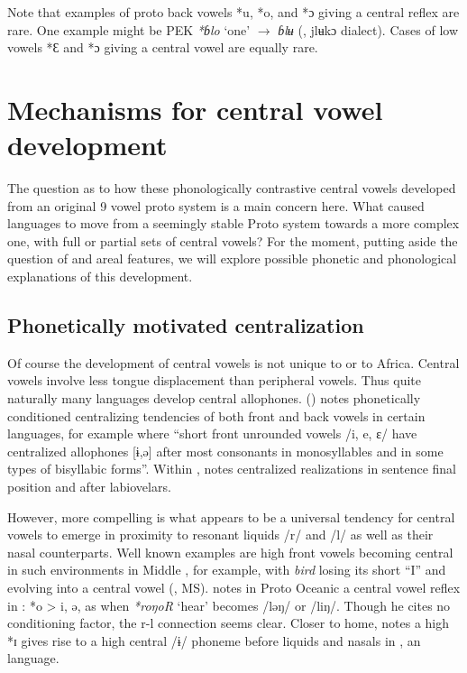 \documentclass[output=paper,newtxmath,modfonts,nonflat,draft]{langsci/langscibook}
\begin{document}
Note that examples of proto back vowels *u, *o, and *ɔ giving a central reflex are rare.  One example might be PEK \textit{*ɓlo} ‘one’ $\rightarrow$ \textit{ɓlʉ}  (, jlʉkɔ dialect). Cases of low vowels *Ɛ and *ɔ giving a central vowel are equally rare.

\section{Mechanisms for central vowel development}\label{sec:zogbo:4}

The question as to how these phonologically contrastive central vowels developed from an original 9 vowel proto system is a main concern here. What caused languages to move from a seemingly stable Proto system towards a more complex one, with full or partial sets of central vowels? For the moment, putting aside the question of  and areal features, we will explore possible phonetic and phonological explanations of this development. 

\subsection{Phonetically motivated centralization}\label{sec:zogbo:4.1}

Of course the development of central vowels is not unique to  or to Africa. Central vowels involve less tongue displacement than peripheral vowels. Thus quite naturally many languages develop central allophones. \citeauthor{Welmers1973} (\citeyear[23, 25]{Welmers1973}) notes phonetically conditioned centralizing tendencies of both front and back vowels in certain  languages, for example  where “short front unrounded vowels /i, e, ɛ/ have centralized allophones [ɨ,ə] after most consonants in monosyllables and in some types of bisyllabic forms”. Within , \citet{Bentinck1978} notes centralized realizations in sentence final position and after labiovelars.

However, more compelling is what appears to be a universal tendency for central vowels to emerge in proximity to resonant liquids /r/ and /l/ as well as their nasal counterparts.  Well known examples are high front vowels becoming central in such environments in Middle , for example, with \textit{bird} losing its short “I” and evolving into a central vowel (\citeauthor{hickeyms}, MS). \citet[76]{Lynch2015} notes in Proto Oceanic a central vowel reflex in : *o > i, ə, as when \textit{*roŋoR} ‘hear’ becomes /ləŋ/ or /liŋ/.  Though he cites no conditioning factor, the r-l connection seems clear. Closer to home, \citet{Morton2012} notes a high *ɪ gives rise to a high central /ɨ/ phoneme before liquids and nasals in , an  language.  
\end{document}
